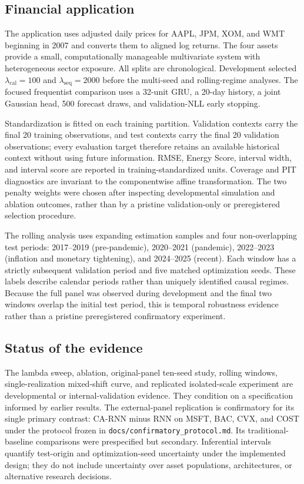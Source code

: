 \documentclass[11pt]{article}
\begin{document}
\subsection{Financial application}

The application uses adjusted daily prices for AAPL, JPM, XOM, and WMT beginning
in 2007 and converts them to aligned log returns. The four assets provide a small,
computationally manageable multivariate system with heterogeneous sector exposure.
All splits are chronological. Development selected
$\lambda_{\mathrm{cal}}=100$ and $\lambda_{\mathrm{seq}}=2000$ before the
multi-seed and rolling-regime analyses. The focused frequentist comparison uses a
32-unit GRU, a 20-day history, a joint Gaussian head, 500 forecast draws, and
validation-NLL early stopping.

Standardization is fitted on each training partition. Validation contexts carry
the final 20 training observations, and test contexts carry the final 20
validation observations; every evaluation target therefore retains an available
historical context without using future information. RMSE, Energy Score, interval
width, and interval score are reported in training-standardized units. Coverage
and PIT diagnostics are invariant to the componentwise affine transformation.
The two penalty weights were chosen after inspecting developmental simulation
and ablation outcomes, rather than by a pristine validation-only or preregistered
selection procedure.

The rolling analysis uses expanding estimation samples and four non-overlapping
test periods: 2017--2019 (pre-pandemic), 2020--2021 (pandemic), 2022--2023
(inflation and monetary tightening), and 2024--2025 (recent). Each window has a
strictly subsequent validation period and five matched optimization seeds. These
labels describe calendar periods rather than uniquely identified causal regimes.
Because the full panel was observed during development and the final two windows
overlap the initial test period, this is temporal robustness evidence rather than
a pristine preregistered confirmatory experiment.

\subsection{Status of the evidence}

The lambda sweep, ablation, original-panel ten-seed study, rolling windows,
single-realization mixed-shift curve, and replicated isolated-scale experiment
are developmental or internal-validation evidence. They
condition on a specification informed by earlier results. The external-panel
replication is confirmatory for its single primary contrast: CA-RNN
minus RNN on MSFT, BAC, CVX, and COST under the protocol frozen in
\texttt{docs/confirmatory\_protocol.md}. Its traditional-baseline comparisons
were prespecified but secondary. Inferential intervals quantify test-origin and
optimization-seed uncertainty under the implemented design; they do not include
uncertainty over asset populations, architectures, or alternative research
decisions.
\end{document}
